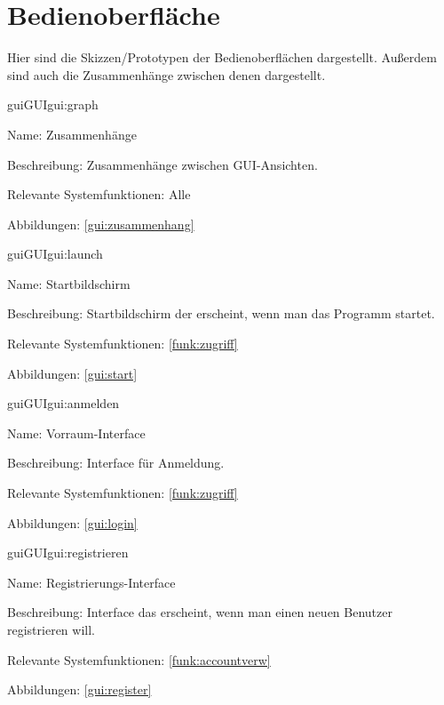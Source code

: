 
\section{Bedienoberfläche}

Hier sind die Skizzen/Prototypen der Bedienoberflächen dargestellt. Außerdem sind auch die Zusammenhänge zwischen denen dargestellt.

\setcounter{gui}{10}

\begin{description}[leftmargin=5em, style=sameline]	
	\begin{lhp}{gui}{GUI}{gui:graph}
		\item[Name:] Zusammenhänge
		\item[Beschreibung:] Zusammenhänge zwischen GUI-Ansichten.
		\item[Relevante Systemfunktionen:] Alle
		\item[Abbildungen:] \ref{gui:zusammenhang}
	\end{lhp}
\end{description}

\begin{description}[leftmargin=5em, style=sameline]	
	\begin{lhp}{gui}{GUI}{gui:launch}
		\item[Name:] Startbildschirm
		\item[Beschreibung:] Startbildschirm der erscheint, wenn man das Programm startet.
		\item[Relevante Systemfunktionen:] \ref{funk:zugriff}
		\item[Abbildungen:] \ref{gui:start}
	\end{lhp}
\end{description}

\begin{description}[leftmargin=5em, style=sameline]	
	\begin{lhp}{gui}{GUI}{gui:anmelden}
		\item[Name:] Vorraum-Interface
		\item[Beschreibung:] Interface für Anmeldung.
		\item[Relevante Systemfunktionen:] \ref{funk:zugriff}
		\item[Abbildungen:] \ref{gui:login}
	\end{lhp}
\end{description}

\begin{description}[leftmargin=5em, style=sameline]	
	\begin{lhp}{gui}{GUI}{gui:registrieren}
		\item[Name:] Registrierungs-Interface
		\item[Beschreibung:] Interface das erscheint, wenn man einen neuen Benutzer registrieren will.
		\item[Relevante Systemfunktionen:] \ref{funk:accountverw}
		\item[Abbildungen:] \ref{gui:register}
	\end{lhp}
\end{description}

